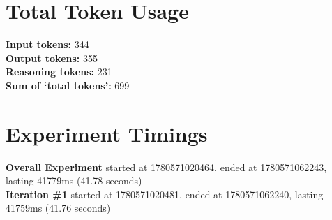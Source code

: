 \documentclass{article}
\begin{document}
\section*{Total Token Usage}
\textbf{Input tokens: }344
\\\textbf{Output tokens: }355
\\\textbf{Reasoning tokens: }231
\\\textbf{Sum of `total tokens': }699
\section*{Experiment Timings}
\textbf{Overall Experiment} started at 1780571020464, ended at 1780571062243, lasting 41779ms (41.78 seconds)
\\\textbf{Iteration \#1} started at 1780571020481, ended at 1780571062240, lasting 41759ms (41.76 seconds)
\end{document}
